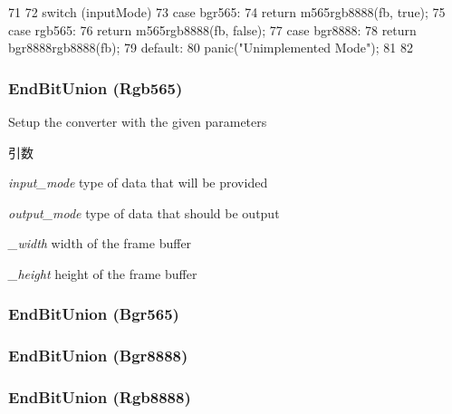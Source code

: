 \begin{DoxyCode}
71 {
72     switch (inputMode) {
73       case bgr565:
74         return m565rgb8888(fb, true);
75       case rgb565:
76         return m565rgb8888(fb, false);
77       case bgr8888:
78         return bgr8888rgb8888(fb);
79       default:
80         panic("Unimplemented Mode\n");
81     }
82 }
\end{DoxyCode}
\hypertarget{classVideoConvert_aeecd01b88aca2832c32a16728474c9d7}{
\subsubsection[{EndBitUnion}]{\setlength{\rightskip}{0pt plus 5cm}EndBitUnion (Rgb565)}}
\label{classVideoConvert_aeecd01b88aca2832c32a16728474c9d7}
Setup the converter with the given parameters 
\begin{DoxyParams}{引数}
\item[{\em input\_\-mode}]type of data that will be provided \item[{\em output\_\-mode}]type of data that should be output \item[{\em \_\-width}]width of the frame buffer \item[{\em \_\-height}]height of the frame buffer \end{DoxyParams}
\hypertarget{classVideoConvert_a86b1b56dda6a6798fe7774f250fd658a}{
\subsubsection[{EndBitUnion}]{\setlength{\rightskip}{0pt plus 5cm}EndBitUnion (Bgr565)}}
\label{classVideoConvert_a86b1b56dda6a6798fe7774f250fd658a}
\hypertarget{classVideoConvert_afadfb7851997f9fb787490995c281037}{
\subsubsection[{EndBitUnion}]{\setlength{\rightskip}{0pt plus 5cm}EndBitUnion (Bgr8888)}}
\label{classVideoConvert_afadfb7851997f9fb787490995c281037}
\hypertarget{classVideoConvert_a4773afbbd60896bb01da63f019215893}{
\subsubsection[{EndBitUnion}]{\setlength{\rightskip}{0pt plus 5cm}EndBitUnion (Rgb8888)}}
